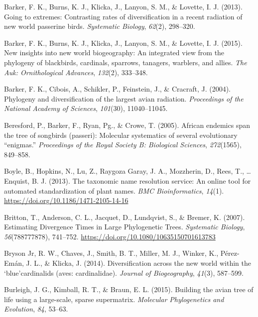 \documentclass[
  man]{apa6}
\newlength{\cslhangindent}
\newlength{\cslentryspacingunit} %
\newenvironment{CSLReferences}[2] %
 {%
  \setlength{\parindent}{0pt}
  \ifodd #1
  \let\oldpar\par
  \def\par{\hangindent=\cslhangindent\oldpar}
  \fi
  \setlength{\parskip}{#2\cslentryspacingunit}
 }%
 {}
\begin{document}
\begin{CSLReferences}{1}{0}
\leavevmode{}%
Barker, F. K., Burns, K. J., Klicka, J., Lanyon, S. M., \& Lovette, I. J. (2013). Going to extremes: Contrasting rates of diversification in a recent radiation of new world passerine birds. \emph{{Systematic Biology}}, \emph{62}(2), 298--320.

\leavevmode{}%
Barker, F. K., Burns, K. J., Klicka, J., Lanyon, S. M., \& Lovette, I. J. (2015). New insights into new world biogeography: An integrated view from the phylogeny of blackbirds, cardinals, sparrows, tanagers, warblers, and allies. \emph{The Auk: Ornithological Advances}, \emph{132}(2), 333--348.

\leavevmode{}%
Barker, F. K., Cibois, A., Schikler, P., Feinstein, J., \& Cracraft, J. (2004). Phylogeny and diversification of the largest avian radiation. \emph{Proceedings of the National Academy of Sciences}, \emph{101}(30), 11040--11045.

\leavevmode{}%
Beresford, P., Barker, F., Ryan, Pg., \& Crowe, T. (2005). African endemics span the tree of songbirds (passeri): Molecular systematics of several evolutionary {``enigmas.''} \emph{Proceedings of the Royal Society B: Biological Sciences}, \emph{272}(1565), 849--858.

\leavevmode{}%
Boyle, B., Hopkins, N., Lu, Z., Raygoza Garay, J. A., Mozzherin, D., Rees, T., \ldots{} Enquist, B. J. (2013). {The taxonomic name resolution service: An online tool for automated standardization of plant names}. \emph{{BMC Bioinformatics}}, \emph{14}(1). \url{https://doi.org/10.1186/1471-2105-14-16}

\leavevmode{}%
Britton, T., Anderson, C. L., Jacquet, D., Lundqvist, S., \& Bremer, K. (2007). {Estimating Divergence Times in Large Phylogenetic Trees}. \emph{{Systematic Biology}}, \emph{56}(788777878), 741--752. \url{https://doi.org/10.1080/10635150701613783}

\leavevmode{}%
Bryson Jr, R. W., Chaves, J., Smith, B. T., Miller, M. J., Winker, K., Pérez-Emán, J. L., \& Klicka, J. (2014). Diversification across the new world within the `blue'cardinalids (aves: cardinalidae). \emph{Journal of Biogeography}, \emph{41}(3), 587--599.

\leavevmode{}%
Burleigh, J. G., Kimball, R. T., \& Braun, E. L. (2015). Building the avian tree of life using a large-scale, sparse supermatrix. \emph{Molecular Phylogenetics and Evolution}, \emph{84}, 53--63.


\end{CSLReferences}
\end{document}
